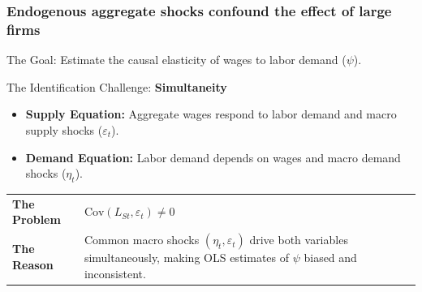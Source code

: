 \documentclass[aspectratio=169,11pt]{beamer}
\begin{document}
\begin{frame}
    \frametitle{Endogenous aggregate shocks confound the effect of large firms}

    \vspace{0.5cm}
    {\Large
        The Goal: Estimate the causal elasticity of wages to labor demand ($\psi$).
    }

    \vspace{0.8cm}
    {\Large
        The Identification Challenge: \textbf{Simultaneity}
    }

    \vspace{0.4cm}
    \begin{itemize}
        \item \textbf{Supply Equation:} Aggregate wages respond to labor demand and macro supply shocks ($\varepsilon_t$).
        \item \textbf{Demand Equation:} Labor demand depends on wages and macro demand shocks ($\eta_t$).
    \end{itemize}

    \vspace{0.6cm}
    \begin{center}
        \renewcommand{\arraystretch}{1.5}
        \begin{tabular}{l p{8cm}}
            \textcolor{DeepRed}{\textbf{The Problem}} & \Large $\text{Cov}(L_{St}, \varepsilon_t) \neq 0$ \\
            \textcolor{WarmGray}{\textbf{The Reason}}  & Common macro shocks $(\eta_t, \varepsilon_t)$ drive both variables simultaneously, making OLS estimates of $\psi$ biased and inconsistent.
        \end{tabular}
    \end{center}

\end{frame}
\end{document}
